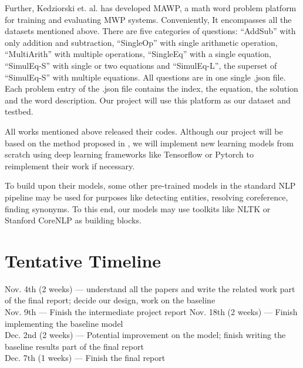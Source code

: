 \documentclass[11pt,a4paper]{article}
\begin{document}
 Further, Kedziorski et. al. \citep{Koncel-Kedziorski:16} has developed MAWP, a math word problem platform for training
 and evaluating MWP systems. Conveniently, It encompasses all the datasets mentioned above. There are five categories
 of questions: ``AddSub'' with only addition and subtraction, ``SingleOp'' with single arithmetic operation, ``MultiArith'' with 
 multiple operations, ``SingleEq'' with a single equation, ``SimulEq-S'' with single or two equations and ``SimulEq-L'', the
 superset of ``SimulEq-S'' with multiple equations.
 All questions are in one single .json file.
 Each problem entry of the .json file contains the index, the equation, the solution and the word description. Our project
 will use this platform as our dataset and testbed.
   
 All works mentioned above released their codes. Although our project will be based on the method proposed
 in  \citep{Kushman:14}, we will implement
 new learning models from scratch using deep learning frameworks like Tensorflow or Pytorch to reimplement their work if necessary. 
    
 To build upon their models, some other pre-trained models in the standard NLP pipeline may be used for purposes like
 detecting entities, resolving coreference, finding synonyms. To this end, our models may use toolkits
 like NLTK or Stanford CoreNLP as building blocks.  

\section{Tentative Timeline}
Nov. 4th (2 weeks) --- understand all the papers and write the related work part of the final report; decide our design, work on the baseline \\
Nov. 9th --- Finish the intermediate project report
Nov. 18th (2 weeks) --- Finish implementing the baseline model \\
Dec. 2nd (2 weeks) --- Potential improvement on the model; finish writing the baseline results part of the final report\\
Dec. 7th (1 weeks) --- Finish the final report



\end{document}
